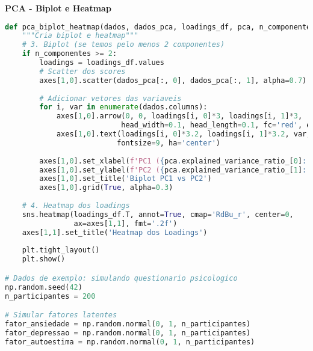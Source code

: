 \begin{researchbox}
\textbf{PCA - Biplot e Heatmap}

\begin{lstlisting}[language=Python]
def pca_biplot_heatmap(dados, dados_pca, loadings_df, pca, n_componentes, axes):
    """Cria biplot e heatmap"""
    # 3. Biplot (se temos pelo menos 2 componentes)
    if n_componentes >= 2:
        loadings = loadings_df.values
        # Scatter dos scores
        axes[1,0].scatter(dados_pca[:, 0], dados_pca[:, 1], alpha=0.7)
        
        # Adicionar vetores das variaveis
        for i, var in enumerate(dados.columns):
            axes[1,0].arrow(0, 0, loadings[i, 0]*3, loadings[i, 1]*3, 
                           head_width=0.1, head_length=0.1, fc='red', ec='red')
            axes[1,0].text(loadings[i, 0]*3.2, loadings[i, 1]*3.2, var, 
                          fontsize=9, ha='center')
        
        axes[1,0].set_xlabel(f'PC1 ({pca.explained_variance_ratio_[0]:.1%})')
        axes[1,0].set_ylabel(f'PC2 ({pca.explained_variance_ratio_[1]:.1%})')
        axes[1,0].set_title('Biplot PC1 vs PC2')
        axes[1,0].grid(True, alpha=0.3)
    
    # 4. Heatmap dos loadings
    sns.heatmap(loadings_df.T, annot=True, cmap='RdBu_r', center=0, 
                ax=axes[1,1], fmt='.2f')
    axes[1,1].set_title('Heatmap dos Loadings')
    
    plt.tight_layout()
    plt.show()

# Dados de exemplo: simulando questionario psicologico
np.random.seed(42)
n_participantes = 200

# Simular fatores latentes
fator_ansiedade = np.random.normal(0, 1, n_participantes)
fator_depressao = np.random.normal(0, 1, n_participantes)
fator_autoestima = np.random.normal(0, 1, n_participantes)
\end{lstlisting}
\end{researchbox}

